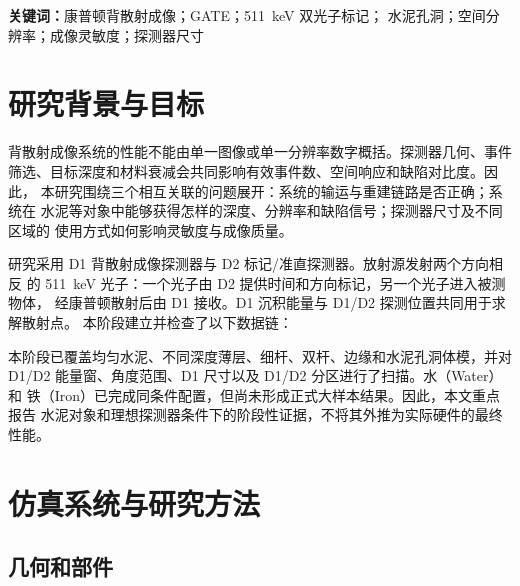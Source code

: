 \documentclass[UTF8,a4paper,zihao=-4,fontset=fandol]{ctexart}
\begin{document}
\vspace{0.8em}
\noindent\textbf{关键词：}康普顿背散射成像；GATE；511~keV 双光子标记；
水泥孔洞；空间分辨率；成像灵敏度；探测器尺寸

\clearpage
\begingroup
  \small
  \setlength{\parskip}{0pt}
  \tableofcontents
\endgroup
\clearpage
{}

\section{研究背景与目标}

背散射成像系统的性能不能由单一图像或单一分辨率数字概括。探测器几何、事件
筛选、目标深度和材料衰减会共同影响有效事件数、空间响应和缺陷对比度。因此，
本研究围绕三个相互关联的问题展开：系统的输运与重建链路是否正确；系统在
水泥等对象中能够获得怎样的深度、分辨率和缺陷信号；探测器尺寸及不同区域的
使用方式如何影响灵敏度与成像质量。

研究采用 D1 背散射成像探测器与 D2 标记/准直探测器。放射源发射两个方向相反
的 511~keV 光子：一个光子由 D2 提供时间和方向标记，另一个光子进入被测物体，
经康普顿散射后由 D1 接收。D1 沉积能量与 D1/D2 探测位置共同用于求解散射点。
本阶段建立并检查了以下数据链：

\begin{center}
  \small
\end{center}

本阶段已覆盖均匀水泥、不同深度薄层、细杆、双杆、边缘和水泥孔洞体模，并对
D1/D2 能量窗、角度范围、D1 尺寸以及 D1/D2 分区进行了扫描。水（Water）和
铁（Iron）已完成同条件配置，但尚未形成正式大样本结果。因此，本文重点报告
水泥对象和理想探测器条件下的阶段性证据，不将其外推为实际硬件的最终性能。

\section{仿真系统与研究方法}

\subsection{几何和部件}
\end{document}
